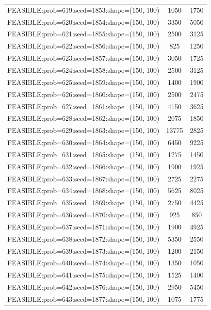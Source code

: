 \begin{longtable}{lcc}
FEASIBLE:prob=619:seed=1853:shape=(150, 100) &     1050 &  1750 \\
FEASIBLE:prob=620:seed=1854:shape=(150, 100) &     3350 &  5050 \\
FEASIBLE:prob=621:seed=1855:shape=(150, 100) &     2500 &  3125 \\
FEASIBLE:prob=622:seed=1856:shape=(150, 100) &      825 &  1250 \\
FEASIBLE:prob=623:seed=1857:shape=(150, 100) &     3050 &  1725 \\
FEASIBLE:prob=624:seed=1858:shape=(150, 100) &     2500 &  3125 \\
FEASIBLE:prob=625:seed=1859:shape=(150, 100) &     1400 &  1900 \\
FEASIBLE:prob=626:seed=1860:shape=(150, 100) &     2500 &  2475 \\
FEASIBLE:prob=627:seed=1861:shape=(150, 100) &     4150 &  3625 \\
FEASIBLE:prob=628:seed=1862:shape=(150, 100) &     2075 &  1850 \\
FEASIBLE:prob=629:seed=1863:shape=(150, 100) &    13775 &  2825 \\
FEASIBLE:prob=630:seed=1864:shape=(150, 100) &     6450 &  9225 \\
FEASIBLE:prob=631:seed=1865:shape=(150, 100) &     1275 &  1450 \\
FEASIBLE:prob=632:seed=1866:shape=(150, 100) &     1900 &  1925 \\
FEASIBLE:prob=633:seed=1867:shape=(150, 100) &     2725 &  2275 \\
FEASIBLE:prob=634:seed=1868:shape=(150, 100) &     5625 &  8025 \\
FEASIBLE:prob=635:seed=1869:shape=(150, 100) &     2750 &  4425 \\
FEASIBLE:prob=636:seed=1870:shape=(150, 100) &      925 &   850 \\
FEASIBLE:prob=637:seed=1871:shape=(150, 100) &     1900 &  4925 \\
FEASIBLE:prob=638:seed=1872:shape=(150, 100) &     5350 &  2550 \\
FEASIBLE:prob=639:seed=1873:shape=(150, 100) &     1200 &  2150 \\
FEASIBLE:prob=640:seed=1874:shape=(150, 100) &     1350 &  1050 \\
FEASIBLE:prob=641:seed=1875:shape=(150, 100) &     1525 &  1400 \\
FEASIBLE:prob=642:seed=1876:shape=(150, 100) &     2950 &  5450 \\
FEASIBLE:prob=643:seed=1877:shape=(150, 100) &     1075 &  1775 \\

\end{longtable}
